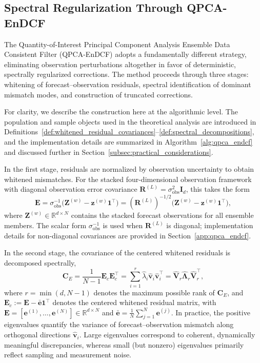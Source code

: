 \documentclass[11pt,a4paper]{article}
\begin{document}
\subsection{Spectral Regularization Through QPCA-EnDCF}

The Quantity-of-Interest Principal Component Analysis Ensemble Data Consistent Filter (QPCA-EnDCF) adopts a fundamentally different strategy, eliminating observation perturbations altogether in favor of deterministic, spectrally regularized corrections. The method proceeds through three stages: whitening of forecast--observation residuals, spectral identification of dominant mismatch modes, and construction of truncated corrections.

For clarity, we describe the construction here at the algorithmic level. The population and sample objects used in the theoretical analysis are introduced in Definitions~\ref{def:whitened_residual_covariances}--\ref{def:spectral_decompositions}, and the implementation details are summarized in Algorithm~\ref{alg:qpca_endcf} and discussed further in Section~\ref{subsec:practical_considerations}.

In the first stage, residuals are normalized by observation uncertainty to obtain whitened mismatches. For the stacked four-dimensional observation framework with diagonal observation error covariance $\mathbf{R}^{(L)}=\sigma_{\mathrm{obs}}^2\mathbf{I}_{d}$, this takes the form
\begin{equation}
\mathbf{E}
=
\sigma_{\mathrm{obs}}^{-1}
\bigl(\mathbf{Z}^{(w)}-\mathbf{z}^{(w)}\mathbf{1}^\top\bigr)
=
(\mathbf{R}^{(L)})^{-1/2}
\bigl(\mathbf{Z}^{(w)}-\mathbf{z}^{(w)}\mathbf{1}^\top\bigr),
\label{eq:whitening_problem}
\end{equation}
where $\mathbf{Z}^{(w)}\in\mathbb{R}^{d\times N}$ contains the stacked forecast observations for all ensemble members. The scalar form $\sigma_{\mathrm{obs}}^{-1}$ is used when $\mathbf{R}^{(L)}$ is diagonal; implementation details for non-diagonal covariances are provided in Section~\ref{app:qpca_endcf}.

In the second stage, the covariance of the centered whitened residuals is decomposed spectrally,
\begin{equation}
\mathbf{C}_E
=
\frac{1}{N-1}\mathbf{E}_c\mathbf{E}_c^\top
=
\sum_{i=1}^{r}\hat{\lambda}_i\hat{\mathbf{v}}_i\hat{\mathbf{v}}_i^\top = \hat{\mathbf{V}}_r \hat{\boldsymbol{\Lambda}}_r \hat{\mathbf{V}}_r^\top,
\label{eq:spectral_decomp_problem}
\end{equation}
where $r=\min(d,N-1)$ denotes the maximum possible rank of $\mathbf{C}_E$, and $\mathbf{E}_c:=\mathbf{E}-\bar{\mathbf{e}}\mathbf{1}^\top$ denotes the centered whitened residual matrix, with $\mathbf{E}=[\mathbf{e}^{(1)},\ldots,\mathbf{e}^{(N)}]\in\mathbb{R}^{d\times N}$ and $\bar{\mathbf{e}}=\frac{1}{N}\sum_{j=1}^N\mathbf{e}^{(j)}$. 
In practice, the positive eigenvalues quantify the variance of forecast--observation mismatch along orthogonal directions $\hat{\mathbf{v}}_i$. Large eigenvalues correspond to coherent, dynamically meaningful discrepancies, whereas small (but nonzero) eigenvalues primarily reflect sampling and measurement noise.
\end{document}
